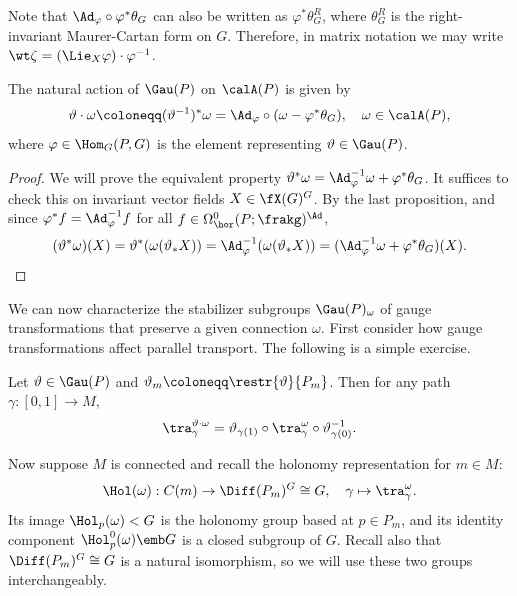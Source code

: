 \begin{rem}
    Note that $\Ad_\varphi\circ \varphi^\ast\theta_G$ can also be written as $\varphi^\ast\theta_G^R$, where $\theta_G^R$ is the right-invariant Maurer-Cartan form on $G$. Therefore, in matrix notation we may write $\wt\zeta=(\Lie_X\varphi)\cdot \varphi^{-1}$.
\end{rem}

\begin{prop}\label{prop action of Gau(P) on calA(P)}
    The natural action of $\Gau(P)$ on $\calA(P)$ is given by
    \[\vartheta\cdot\omega\coloneqq (\vartheta^{-1})^\ast\omega=\Ad_\varphi \circ (\omega-\varphi^\ast \theta_G),\quad \omega\in\calA(P),\]
    where $\varphi\in \Hom_G(P,G)$ is the element representing $\vartheta\in \Gau(P)$.
\end{prop}
\begin{proof}
    We will prove the equivalent property $\vartheta^\ast\omega=\Ad_\varphi^{-1}\omega+\varphi^\ast\theta_G$. It suffices to check this on invariant vector fields $X\in \fX(G)^G$. By the last proposition, and since $\varphi^\ast f=\Ad_\varphi^{-1}f$ for all $f\in \Omega^0_{\hor}(P;\frakg)^\Ad$, 
    \[(\vartheta^\ast\omega)(X)=\vartheta^\ast(\omega(\vartheta_\ast X))=\Ad_\varphi^{-1}(\omega(\vartheta_\ast X))=(\Ad_\varphi^{-1}\omega+\varphi^\ast\theta_G)(X).\]
\end{proof}

We can now characterize the stabilizer subgroups $\Gau(P)_\omega$ of gauge transformations that preserve a given connection $\omega$. First consider how gauge transformations affect parallel transport. The following is a simple exercise.

\begin{lem}\label{lem 31794}
    Let $\vartheta\in\Gau(P)$ and $\vartheta_m\coloneqq\restr{\vartheta}{P_m}$. Then for any path $\gamma:[0,1]\to M$, 
    \[\tra_{\gamma}^{\vartheta\cdot\omega}=\vartheta_{\gamma(1)}\circ\tra_\gamma^\omega \circ\vartheta_{\gamma(0)}^{-1}.\]
\end{lem}

Now suppose $M$ is connected and recall the holonomy representation for $m\in M$:
\[\Hol(\omega):C(m)\to \Diff(P_m)^G\cong G,\quad \gamma\mapsto \tra_\gamma^\omega.\]
Its image $\Hol_p(\omega)< G$ is the holonomy group based at $p\in P_m$, and its identity component $\Hol^0_p(\omega)\emb G$ is a closed subgroup of $G$. Recall also that $\Diff(P_m)^G\cong G$ is a natural isomorphism, so we will use these two groups interchangeably.

